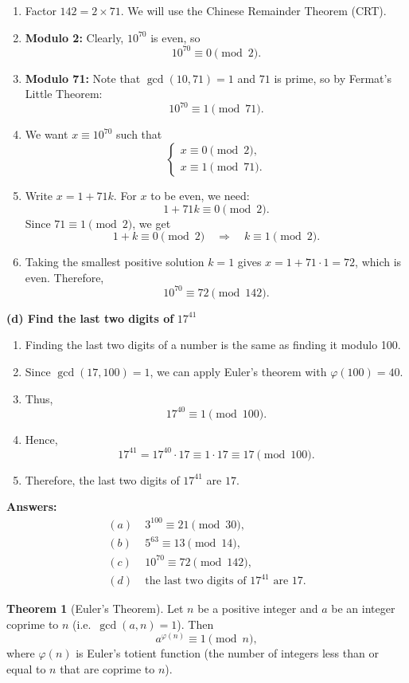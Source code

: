 \documentclass[12pt]{article}
\theoremstyle{definition} %
\newtheorem{theorem}{Theorem}
\theoremstyle{plain} %
\begin{document}
\begin{enumerate}
\item Factor $142 = 2 \times 71$. We will use the Chinese Remainder Theorem (CRT).
\item \textbf{Modulo 2:} Clearly, $10^{70}$ is even, so
\[
10^{70} \equiv 0 \pmod{2}.
\]
\item \textbf{Modulo 71:} Note that $\gcd(10,71) = 1$ and $71$ is prime, so by Fermat's Little Theorem:
\[
10^{70} \equiv 1 \pmod{71}.
\]
\item We want $x \equiv 10^{70}$ such that 
\[
\begin{cases}
x \equiv 0 \pmod{2},\\
x \equiv 1 \pmod{71}.
\end{cases}
\]
\item Write $x = 1 + 71k$. For $x$ to be even, we need:
\[
1 + 71k \equiv 0 \pmod{2}.
\]
Since $71 \equiv 1 \pmod{2}$, we get
\[
1 + k \equiv 0 \pmod{2} \quad\Longrightarrow\quad k \equiv 1 \pmod{2}.
\]
\item Taking the smallest positive solution $k=1$ gives $x = 1 + 71 \cdot 1 = 72$, which is even. Therefore,
\[
10^{70} \equiv 72 \pmod{142}.
\]
\end{enumerate}

\bigskip
\textbf{(d) Find the last two digits of } $17^{41}$

\begin{enumerate}
\item Finding the last two digits of a number is the same as finding it modulo 100.
\item Since $\gcd(17,100) = 1$, we can apply Euler's theorem with $\varphi(100) = 40$.
\item Thus,
\[
17^{40} \equiv 1 \pmod{100}.
\]
\item Hence,
\[
17^{41} = 17^{40} \cdot 17 \equiv 1 \cdot 17 \equiv 17 \pmod{100}.
\]
\item Therefore, the last two digits of $17^{41}$ are $\boxed{17}$.
\end{enumerate}

\bigskip
\textbf{Answers:}
\[
\begin{aligned}
(a)\;&3^{100} \equiv 21 \pmod{30},\\
(b)\;&5^{63} \equiv 13 \pmod{14},\\
(c)\;&10^{70} \equiv 72 \pmod{142},\\
(d)\;&\text{the last two digits of }17^{41}\text{ are }17.
\end{aligned}
\]

\begin{theorem}[Euler's Theorem]
    Let $n$ be a positive integer and $a$ be an integer coprime to $n$ 
    (i.e.\ $\gcd(a,n) = 1$). Then
    \[
      a^{\varphi(n)} \equiv 1 \pmod{n},
    \]
    where $\varphi(n)$ is Euler's totient function (the number of integers 
    less than or equal to $n$ that are coprime to $n$).
  \end{theorem}
  
\end{document}
